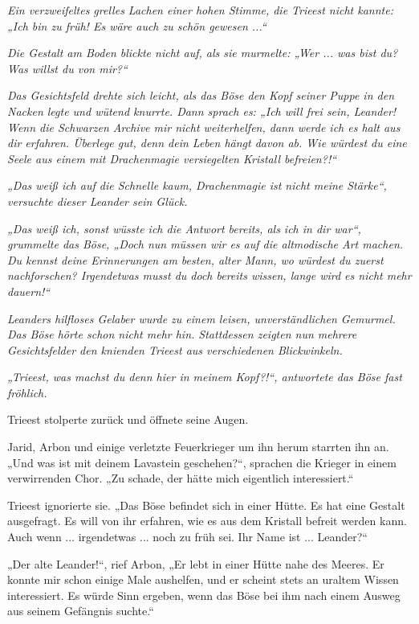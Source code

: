\textit{Ein verzweifeltes grelles Lachen einer hohen Stimme, die Trieest nicht kannte: „Ich bin zu früh! Es wäre auch zu schön gewesen ...“}

\textit{Die Gestalt am Boden blickte nicht auf, als sie murmelte: „Wer ... was bist du? Was willst du von mir?“}

\textit{Das Gesichtsfeld drehte sich leicht, als das Böse den Kopf seiner Puppe in den Nacken legte und wütend knurrte. Dann sprach es: „Ich will frei sein, Leander! Wenn die Schwarzen Archive mir nicht weiterhelfen, dann werde ich es halt aus dir erfahren. Überlege gut, denn dein Leben hängt davon ab. Wie würdest du eine Seele aus einem mit Drachenmagie versiegelten Kristall befreien?!“}

\textit{„Das weiß ich auf die Schnelle kaum, Drachenmagie ist nicht meine Stärke“, versuchte dieser Leander sein Glück.}

\textit{„Das weiß ich, sonst wüsste ich die Antwort bereits, als ich in dir war“, grummelte das Böse, „Doch nun müssen wir es auf die altmodische Art machen. Du kennst deine Erinnerungen am besten, alter Mann, wo würdest du zuerst nachforschen? Irgendetwas musst du doch bereits wissen, lange wird es nicht mehr dauern!“}

\textit{Leanders hilfloses Gelaber wurde zu einem leisen, unverständlichen Gemurmel. Das Böse hörte schon nicht mehr hin. Stattdessen zeigten nun mehrere Gesichtsfelder den knienden Trieest aus verschiedenen Blickwinkeln.}

\textit{„Trieest, was machst du denn hier in meinem Kopf?!“, antwortete das Böse fast fröhlich.}\bigskip



Trieest stolperte zurück und öffnete seine Augen.

Jarid, Arbon und einige verletzte Feuerkrieger um ihn herum starrten ihn an. „Und was ist mit deinem Lavastein geschehen?“, sprachen die Krieger in einem verwirrenden Chor. „Zu schade, der hätte mich eigentlich interessiert.“

Trieest ignorierte sie. „Das Böse befindet sich in einer Hütte. Es hat eine Gestalt ausgefragt. Es will von ihr erfahren, wie es aus dem Kristall befreit werden kann. Auch wenn ... irgendetwas ... noch zu früh sei. Ihr Name ist ... Leander?“

„Der alte Leander!“, rief Arbon, „Er lebt in einer Hütte nahe des Meeres. Er konnte mir schon einige Male aushelfen, und er scheint stets an uraltem Wissen interessiert. Es würde Sinn ergeben, wenn das Böse bei ihm nach einem Ausweg aus seinem Gefängnis suchte.“

